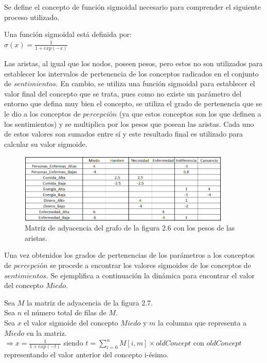 Se define el concepto de función sigmoidal necesario para comprender el siguiente proceso utilizado.\autocite{Saeed2021}
\begin{center}
    Una función sigmoidal está definida por:\\
    $\sigma(x)= \frac{1}{1+exp(-x)}$
\end{center}

Las aristas, al igual que los nodos, poseen pesos, pero estos no son utilizados para establecer los intervalos
de pertenencia de los conceptos radicados en el conjunto de $sentimientos$. En cambio, se utiliza una función 
sigmoidal para establecer el valor final del concepto que se trata, pues como no existe un parámetro del 
entorno que defina muy bien el concepto, se utiliza el grado de pertenencia que se le dio a los conceptos
de $percepci$ó$n$ (ya que estos conceptos son los que definen a los sentimientos) y se multiplica por los pesos 
que posean las aristas. Cada uno de estos valores son sumados entre sí y este resultado final es utilizado 
para calcular su valor sigmoide.\\

\begin{figure}[htb]
    \centering
    \includegraphics[width=0.9\textwidth]{Graphics/Pesos_aristas_Pers_Sent.png}
    \caption{Matriz de adyacencia del grafo de la figura 2.6 con los pesos de las aristas.}
\end{figure}

Una vez obtenidos los grados de pertenencias de los parámetros a los conceptos de $percepci$ó$n$ se procede 
a encontrar los valores sigmoides de los conceptos de $sentimientos$. Se ejemplifica a continuación la dinámica
para encontrar el valor del concepto $Miedo$.
\begin{center}
    Sea $M$ la matriz de adyacencia de la figura 2.7.\\
    Sea $n$ el número total de filas de $M$.\\
    Sea $x$ el valor sigmoide del concepto $Miedo$ y $m$ la columna que representa a $Miedo$ en la matriz.\\
    $\Rightarrow x = \frac{1}{1+ exp(-t)}$ siendo $t = \sum_{i=0}^{n}M[i,m]\times oldConcept$ con $oldConcept$
    representando el valor anterior del concepto i-ésimo.
\end{center}

